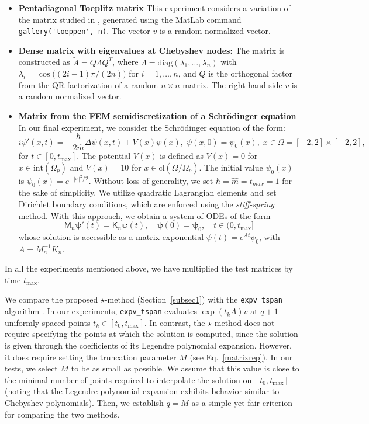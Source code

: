 \documentclass[final,1p,times,number]{elsarticle}
\theoremstyle{plain}%
\begin{document}
\begin{itemize}
 \item \textbf{Pentadiagonal Toeplitz matrix }  
This experiment considers a variation of the matrix studied in \cite{aprahamian2014matrix}, generated using the MatLab command  
\verb|gallery('toeppen', n)|. The vector $v$ is a random normalized vector.
\item \textbf{Dense matrix with eigenvalues at Chebyshev nodes:} 
The matrix is constructed as $\tilde{A} = Q\Lambda Q^T$, where 
$\Lambda =  \mathrm{diag}(\lambda_1, \ldots, \lambda_n)$ with 
$\lambda_i = \cos\bigl((2i-1)\pi/(2n)\bigr)$ for $i = 1, \ldots, n$, 
and $Q$ is the orthogonal factor from the QR factorization of a random $n\times n$ matrix. 
The right-hand side $v$ is a random normalized vector.

\item \textbf{Matrix from the FEM semidiscretization of a Schrödinger equation}
In  our final experiment, we consider the Schr\"{o}dinger equation of the form:
\begin{equation*}
i \psi'(x,t) = -\frac{\hbar}{2\hat{m}} \Delta \psi(x,t) + V(x) \psi(x), \; \psi(x,0)  = \psi_0(x), \; x \in \Omega = [-2, 2] \times [-2, 2],
\end{equation*}
for \( t \in [0,t_\text{max}]\).
 The potential \(V(x)\) is defined as \(V(x) = 0\) for \(x \in \mathrm{int}(\Omega_p)\) and \(V(x) = 10\) for \(x \in \mathrm{cl}(\Omega / \Omega_p)\). The initial value $\psi_0(x)$ is \(\psi_0(x) = e^{-|x|^2 / 2}\). Without loss of generality, we set \(\hbar  = \hat{m} = t_{max} = 1\) for the sake of simplicity.
 We utilize quadratic Lagrangian elements and set Dirichlet boundary conditions, which are enforced using the \emph{stiff-spring} method.
With this approach, we obtain a system of ODEs of the form  
\[
\mathsf{M}_n \boldsymbol{\psi}'(t) = \mathsf{K}_n \boldsymbol{\psi}(t), \quad  
\boldsymbol{\psi}(0) = \boldsymbol{\psi}_0, \quad t \in (0,t_\text{max}]
\] 
whose solution is accessible as a matrix exponential $\psi(t) = e^{A t}\psi_0$, with $A = M_n^{-1}K_n$.
\end{itemize}
In all the experiments mentioned above, we have multiplied the test matrices by time $t_{\max}$.

We compare the proposed $\star$-method (Section~\ref{subsec1}) with the \texttt{expv\_tspan} algorithm \cite{al2011computing}.
In our experiments, \texttt{expv\_tspan} evaluates $\exp(t_k A)v$ at $q+1$ uniformly spaced points $t_k \in [t_0, t_{\max}]$.
In contrast, the $\star$-method does not require specifying the points at which the solution is computed, since the solution is given through the coefficients of its Legendre polynomial expansion. However, it does require setting the truncation parameter $M$ (see Eq.~\eqref{matrixrep}).
In our tests, we select $M$ to be as small as possible. We assume that this value is close to the minimal number of points required to interpolate the solution on $[t_0, t_{\max}]$ (noting that the Legendre polynomial expansion exhibits behavior similar to Chebyshev polynomials). Then, we establish $q = M$ as a simple yet fair criterion for comparing the two methods.
\end{document}
